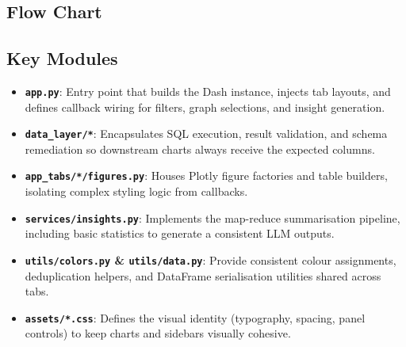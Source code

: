 \documentclass[12pt,a4paper]{article}
\begin{document}
\subsection{Flow Chart}

\begin{figure}[H]
    \centering
\end{figure}

\subsection{Key Modules}

\begin{itemize}
    \item \textbf{\texttt{app.py}}: Entry point that builds the Dash instance, injects tab layouts, and defines callback wiring for filters, graph selections, and insight generation.
    \item \textbf{\texttt{data\_layer/*}}: Encapsulates SQL execution, result validation, and schema remediation so downstream charts always receive the expected columns.
    \item \textbf{\texttt{app\_tabs/*/figures.py}}: Houses Plotly figure factories and table builders, isolating complex styling logic from callbacks.
    \item \textbf{\texttt{services/insights.py}}: Implements the map-reduce summarisation pipeline, including basic statistics to generate a consistent LLM outputs.
    \item \textbf{\texttt{utils/colors.py} \& \texttt{utils/data.py}}: Provide consistent colour assignments, deduplication helpers, and DataFrame serialisation utilities shared across tabs.
    \item \textbf{\texttt{assets/*.css}}: Defines the visual identity (typography, spacing, panel controls) to keep charts and sidebars visually cohesive.
\end{itemize}
\end{document}
